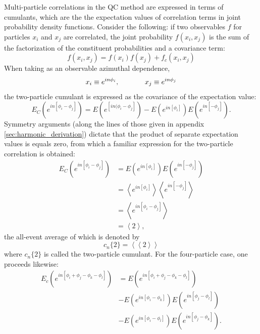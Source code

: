 \documentclass[a5paper]{book}
\numberwithin{equation}{subsection}
\begin{document}
	Multi-particle correlations in the QC method are expressed in terms of cumulants, which are the the expectation values of correlation terms in joint probability density functions. Consider the following: if two observables $f$ for particles $x_i$ and $x_j$ are correlated, the joint probability $f(x_i, x_j)$ is the sum of the factorization of the constituent probabilities and a covariance term:
	\begin{equation}
		f(x_i, x_j) = f(x_i)f(x_j) + f_c (x_i, x_j)
	\end{equation}
	When taking as an observable azimuthal dependence,
	\begin{align}
		x_i \equiv e^{i n \phi_i}, \hspace{.5in} x_j \equiv e^{i n \phi_j} 
	\end{align}
	the two-particle cumulant is expressed as the covariance of the expectation value:
	\begin{equation}
		E_C(e^{i n[\phi_i - \phi_j]}) = E(e^{[i n(\phi_i - \phi_j]}) - E(e^{in[\phi_i]})E(e^{in[- \phi_j]}).
	\end{equation}
	Symmetry arguments (along the lines of those given in appendix \ref{sec:harmonic_derivation}) dictate that the product of separate expectation values is equals zero, from which a familiar expression for the two-particle correlation is obtained:
	\begin{align}
		E_C(e^{i n[\phi_i - \phi_j]}) & = E(e^{in[\phi_i]})E(e^{in[- \phi_j]})                                   \\
		                              & = \left< e^{in[\phi_i]}\right> \left< e^{in[- \phi_j]} \right> \nonumber \\
		                              & = \left< e^{in[\phi_i - \phi_j]} \right> \nonumber                       \\
		                              & = \left< 2 \right>, \nonumber                                            
	\end{align}
	the all-event average of which is denoted by
	\begin{equation}\label{twocul}
		c_n\{2\} = \left< \left< 2 \right> \right>
	\end{equation}
	where $c_n\{2\}$ is called the two-particle cumulant. For the four-particle case, one proceeds likewise:
	\begin{align}
		E_c(e^{in[\phi_i + \phi_j - \phi_k -\phi_l]}) & = E(e^{in[\phi_i + \phi_j - \phi_k -\phi_l]})                     \\
		                                              & - E(e^{in[\phi_i - \phi_k]})E(e^{in[\phi_j - \phi_l]})\nonumber   \\
		                                              & - E(e^{in[\phi_i - \phi_l]})E(e^{in[\phi_j - \phi_k]}). \nonumber 
	\end{align}
\end{document}
